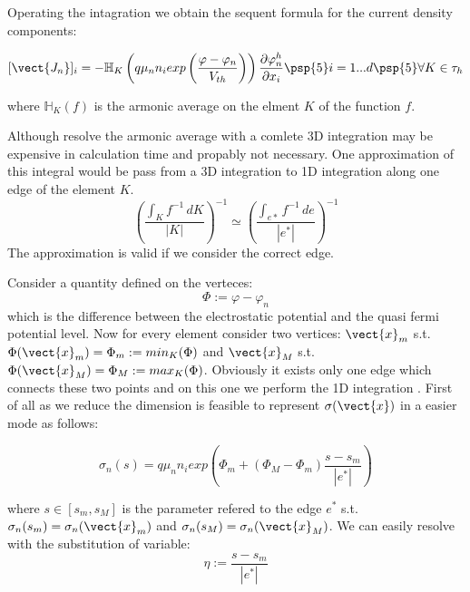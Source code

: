 Operating the intagration we obtain the sequent formula for the current density components:

\begin{equation}
\label{eq: first formula for J}
[\vect{J_n}]_i = - \mathbb{H}_K \left( q \mu_n n_i exp \left( \dfrac{\varphi-\varphi_n}{V_{th}} \right)  \right) \dfrac{\partial \varphi_n^h}{\partial x_i} \psp{5} i = 1...d \psp{5} \forall K \in \tau_h
\end{equation}

where $\mathbb{H}_K(f)$ is the armonic average on the elment $K$ of the function $f$.

Although resolve the armonic average with a comlete 3D integration may be expensive in calculation time and propably not necessary. One approximation of this integral would be pass from a 3D integration to 1D integration along one edge of the element $K$.
\begin{equation}
\label{eq: approzimation from 3D to edge}
\left(\dfrac{\int_K f^{-1} \, dK}{|K|} \right)^{-1} \simeq \left(\dfrac{\int_{e*} f^{-1} \, de}{|e^*|} \right)^{-1}
\end{equation}
  The approximation  is valid if we consider the correct edge.


Consider a quantity defined on the verteces:
\begin{equation}
\label{eq: differenza tra pot e qf}
\Phi := \varphi - 	\varphi_n
\end{equation}
which is the difference between the electrostatic potential and the quasi fermi potential level. Now for every element consider two vertices: $\vect{x}_m$ s.t. $\Phi(\vect{x}_m)=\Phi_m := min_K(\Phi)$ and $\vect{x}_M$ s.t. $\Phi(\vect{x}_M)=\Phi_M:=max_K(\Phi)$. Obviously it exists only one edge which connects these two points and on this one we perform the 1D integration . First of all as we reduce the dimension is feasible to represent $\sigma(\vect{x})$ in a easier mode as follows:

\begin{equation}
\sigma_n(s) = q \mu_n n_i exp\left( \Phi_m + (\Phi_M-\Phi_m)\dfrac{s-s_m}{|e^*|} \right)
\end{equation}

where $s \in [s_m,s_M]$ is the parameter refered to the edge $e^*$ s.t. $\sigma_n(s_m)=\sigma_n(\vect{x}_m)$ and $\sigma_n(s_M)=\sigma_n(\vect{x}_M)$. We can easily resolve  with the substitution of variable:
\begin{equation*}
\eta := \dfrac{s-s_m}{|e^*|}
\end{equation*}

